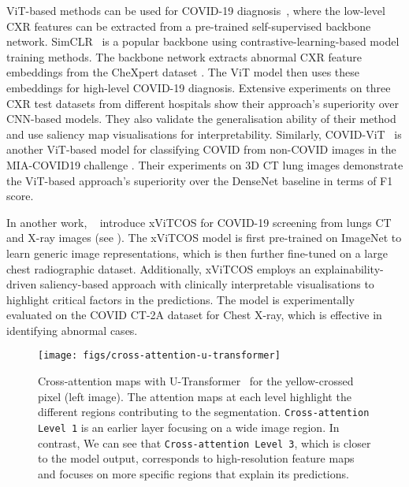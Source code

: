 \documentclass[dvipsnames]{article}
\renewcommand{\cite}[1]{\autocite{#1}}
\begin{document}
ViT-based methods can be used for COVID-19 diagnosis~\cite{park2021vision}, where the low-level CXR features can be extracted from a pre-trained self-supervised backbone network.
SimCLR~\cite{chen2020simple} is a popular backbone using contrastive-learning-based model training methods.
The backbone network extracts abnormal CXR feature embeddings from the CheXpert dataset \cite{irvin2019chexpert}.
The ViT model then uses these embeddings for high-level COVID-19 diagnosis. Extensive experiments on three CXR test datasets from different hospitals show their approach's superiority over CNN-based models. They also validate the generalisation ability of their method and use saliency map visualisations \cite{chefer2021transformer} for interpretability.
Similarly, COVID-ViT~\cite{gao2021covid} is another ViT-based model for classifying COVID from non-COVID images in the MIA-COVID19 challenge \cite{kollias2021mia}. Their experiments on 3D CT lung images demonstrate the ViT-based approach's superiority over the DenseNet baseline \cite{huang2017densely} in terms of F1 score.

In another work, \citeauthor{mondal2021xvitcos}~\cite{mondal2021xvitcos} introduce xViTCOS for COVID-19 screening from lungs CT and X-ray images (see ). The xViTCOS model is first pre-trained on ImageNet to learn generic image representations, which is then further fine-tuned on a large chest radiographic dataset. Additionally, xViTCOS employs an explainability-driven saliency-based approach \cite{chefer2021transformer} with clinically interpretable visualisations to highlight critical factors in the predictions. The model is experimentally evaluated on the COVID CT-2A dataset \cite{gunraj2021covid} for Chest X-ray, which is effective in identifying abnormal cases.


\begin{figure}[tb]
	\centering
	\texttt{[image: figs/cross-attention-u-transformer]}
	\caption{\label{fig:u-transformer}
        Cross-attention maps with U-Transformer~\cite{petit2021u} for the yellow-crossed pixel (left image).
        The attention maps at each level highlight the different regions contributing to the segmentation.
        \texttt{Cross-attention Level 1} is an earlier layer focusing on a wide image region.
        In contrast, We can see that \texttt{Cross-attention Level 3}, which is closer to the model output, corresponds to high-resolution feature maps and focuses on more specific regions that explain its predictions.
    }
\end{figure}
\end{document}
